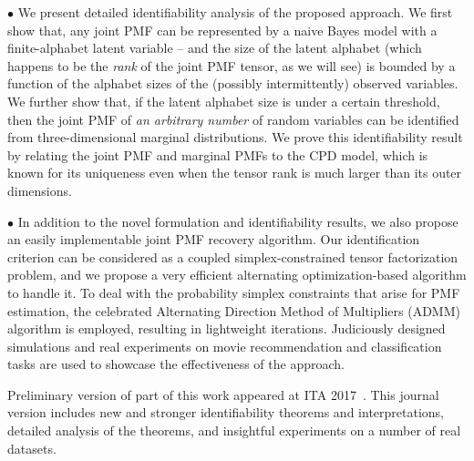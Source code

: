 \documentclass[journal]{IEEEtran}
\begin{document}
\noindent
$\bullet$  
We present detailed identifiability analysis of the proposed approach.
We first show that, any joint PMF can be represented by a naive Bayes model with a finite-alphabet latent variable -- and the size of the latent alphabet (which happens to be the {\em rank} of the joint PMF tensor, as we will see) is bounded by a function of the alphabet sizes of the (possibly intermittently) observed variables. We further show that, if the latent alphabet size is under a certain threshold, then the joint PMF of {\it an arbitrary number} of random variables can be identified from { three-dimensional} marginal distributions. We prove this identifiability result by relating the joint PMF and marginal PMFs to the CPD model, which is known for its uniqueness even when the tensor rank is much larger than its outer dimensions.

\noindent
$\bullet$ In addition to the novel formulation and identifiability results, we also propose an easily implementable joint PMF recovery algorithm. Our identification criterion can be considered as a coupled simplex-constrained tensor factorization problem, and we propose a very efficient alternating optimization-based algorithm to handle it. To deal with the probability simplex constraints that arise for PMF estimation, the celebrated Alternating Direction Method of Multipliers (ADMM) algorithm is employed, resulting in lightweight iterations.  Judiciously designed simulations and real experiments on movie recommendation and classification tasks are used to showcase the effectiveness of the approach.

Preliminary version of part of this work appeared at ITA 2017~\cite{KaSi2017}. This journal version includes new and stronger identifiability theorems and interpretations, detailed analysis of the theorems, and insightful experiments on a number of real datasets.
\end{document}
